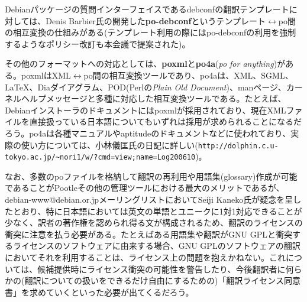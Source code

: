 \documentclass[mingoth,a4paper]{jsarticle}
\begin{document}
Debianパッケージの質問インターフェイスであるdebconfの翻訳テンプレートに対しては、Denis Barbier氏の開発した\textbf{po-debconf}というテンプレート$\leftrightarrow$po間の相互変換の仕組みがある(テンプレート利用の際にはpo-debconfの利用を強制するようなポリシー改訂も本会議で提案された)。

その他のフォーマットへの対応としては、\textbf{poxml}と\textbf{po4a}(\emph{po for anything})がある。poxmlはXML$\leftrightarrow$po間の相互変換ツールであり、po4aは、XML、SGML、LaTeX、Diaダイアグラム、POD(Perlの\emph{Plain Old Document})、manページ、カーネルヘルプメッセージと多種に対応した相互変換ツールである。たとえば、Debianインストーラのドキュメントにはpoxmlが採用されており、現在XMLファイルを直接扱っている日本語についてもいずれは採用が求められることになるだろう。po4aは各種マニュアルやaptitudeのドキュメントなどに使われており、実際の使い方については、小林儀匡氏の日記に詳しい(\texttt{http://dolphin.c.u-tokyo.ac.jp/\textasciitilde nori1/w/?cmd=view;name=Log200610})。



なお、多数のpoファイルを格納して翻訳の再利用や用語集(glossary)作成が可能であることがPootleその他の管理ツールにおける最大のメリットであるが、debian-www@debian.or.jpメーリングリストにおいてSeiji Kaneko氏が疑念を呈したとおり、特に日本語においては英文の単語とユニークに1対1対応できることが少なく、訳者の著作権を認められ得る文が構成されるため、翻訳のライセンスの衝突に注意を払う必要がある。たとえばある用語集や翻訳がGNU GPLと衝突するライセンスのソフトウェアに由来する場合、GNU GPLのソフトウェアの翻訳においてそれを利用することは、ライセンス上の問題を抱えかねない。これについては、候補提供時にライセンス衝突の可能性を警告したり、今後翻訳者に何らかの(翻訳についての扱いをできるだけ自由にするための)「翻訳ライセンス同意書」を求めていくといった必要が出てくるだろう。
\end{document}
